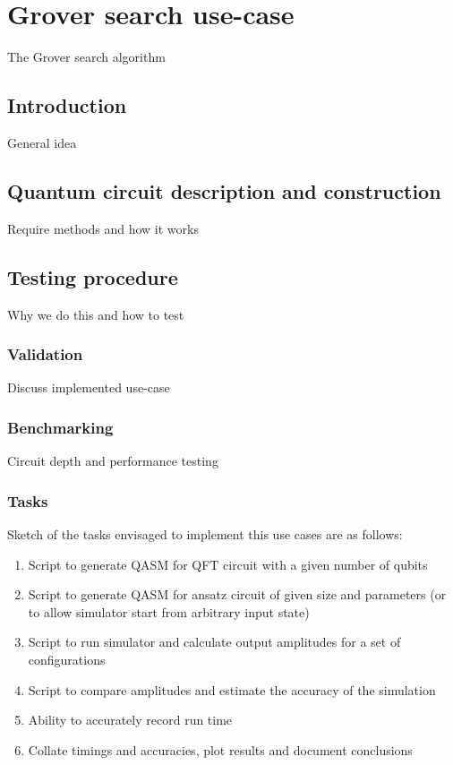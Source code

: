 
\section{Grover search use-case}
The Grover search algorithm

\subsection{Introduction}
General idea


\subsection{Quantum circuit description and construction}
Require methods and how it works
 
\subsection{Testing procedure}
Why we do this and how to test

\subsubsection{Validation}
Discuss implemented use-case 

\subsubsection{Benchmarking}
Circuit depth and performance testing 

\subsubsection{Tasks}
Sketch of the tasks envisaged to implement this use cases are as follows:

\begin{enumerate}
\item Script to generate QASM for QFT circuit with a given number of qubits
\item Script to generate QASM for ansatz circuit of given size and parameters (or to allow simulator start from arbitrary input state)
\item Script to run simulator and calculate output amplitudes for a set of configurations
\item Script to compare amplitudes and estimate the accuracy of the simulation
\item Ability to accurately record run time
\item Collate timings and accuracies, plot results and document conclusions
\end{enumerate}